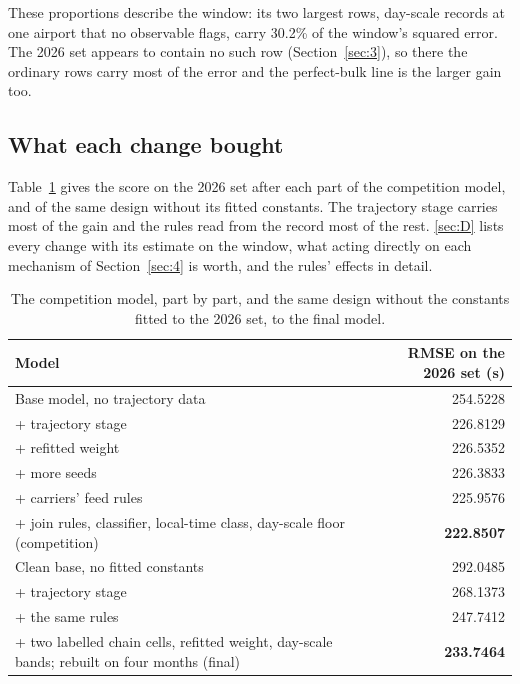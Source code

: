 \documentclass[
  manuscript=article,
  layout=preprint,
  year=2026,
  volume=x,
]{extra/joas}
\begin{document}
These proportions describe the window: its two largest rows, day-scale records at one airport that no observable flags, carry 30.2\% of the window's squared error. The 2026 set appears to contain no such row (Section~\ref{sec:3}), so there the ordinary rows carry most of the error and the perfect-bulk line is the larger gain too.

\subsection{What each change bought}\label{sec:6.3}

Table~\ref{tab:summary} gives the score on the 2026 set after each part of the competition model, and of the same design without its fitted constants. The trajectory stage carries most of the gain and the rules read from the record most of the rest. \ref{sec:D} lists every change with its estimate on the window, what acting directly on each mechanism of Section~\ref{sec:4} is worth, and the rules' effects in detail.

\begin{table}[htbp!]
  \centering
  \small
  \setlength{\tabcolsep}{5pt}\renewcommand{\arraystretch}{1.15}
  \caption{The competition model, part by part, and the same design without the constants fitted to the 2026 set, to the final model.}
  \label{tab:summary}
  \begin{tabular*}{\linewidth}{@{\extracolsep{\fill}}lr}
  \toprule
  \textbf{Model} & \textbf{RMSE on the 2026 set (s)} \\
  \midrule
  Base model, no trajectory data & 254.5228 \\
  \quad + trajectory stage & 226.8129 \\
  \quad + refitted weight & 226.5352 \\
  \quad + more seeds & 226.3833 \\
  \quad + carriers' feed rules & 225.9576 \\
  \quad + join rules, classifier, local-time class, day-scale floor (competition) & \textbf{222.8507} \\
  \midrule
  Clean base, no fitted constants & 292.0485 \\
  \quad + trajectory stage & 268.1373 \\
  \quad + the same rules & 247.7412 \\
  \quad + two labelled chain cells, refitted weight, day-scale bands; rebuilt on four months (final) & \textbf{233.7464} \\
  \bottomrule
  \end{tabular*}
\end{table}
\end{document}
